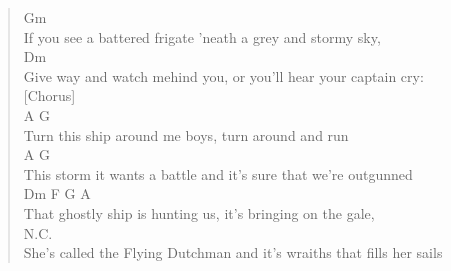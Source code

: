\documentclass[11pt]{article}
\begin{document}
\begin{verse}
Gm\\
If you see a battered frigate 'neath a grey and stormy sky,\\
Dm\\
Give way and watch mehind you, or you'll hear your captain cry:\\
\vspace*{1em}
[Chorus]\\
A                              G\\
Turn this ship around me boys, turn around and run\\
A                                     G\\
This storm it wants a battle and it's sure that we're outgunned\\
Dm                    F                G               A\\
That ghostly ship is hunting us, it's bringing on the gale,\\
N.C.\\
She's called the Flying Dutchman and it's wraiths that fills her sails\\
\end{verse}
\clearpage
\end{document}
